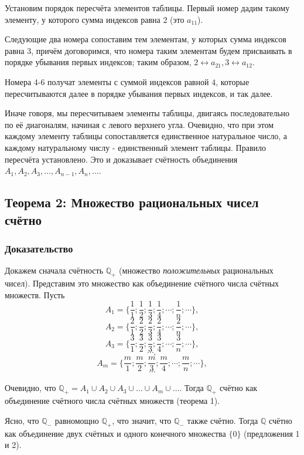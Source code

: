 \documentclass{article}
\begin{document}
Установим порядок пересчёта элементов таблицы. Первый номер дадим такому элементу, у которого сумма индексов равна $2$ (это $a_{11}$). 

Следующие два номера сопоставим тем элементам, у которых сумма индексов равна $3$, причём договоримся, что номера таким элементам будем присваивать в порядке убывания первых индексов; таким образом, $2 \leftrightarrow a_{21}, 3 \leftrightarrow a_{12}$. 

Номера 4-6 получат элементы с суммой индексов равной $4$, которые пересчитываются далее в порядке убывания первых индексов, и так далее.

Иначе говоря, мы пересчитываем элементы таблицы, двигаясь последовательно по её диагоналям, начиная с левого верхнего угла. Очевидно, что при этом каждому элементу таблицы сопоставляется единственное натуральное число, а каждому натуральному числу - единственный элемент таблицы. Правило пересчёта установлено. Это и доказывает счётность объединения $A_1, A_2, A_3, \dots, A_{n-1}, A_n, \dots$.

\subsection{Теорема 2: Множество рациональных чисел счётно}
\subsubsection*{Доказательство}

Докажем сначала счётность $\mathbb{Q}_+$ (множество \textit{положительных} рациональных чисел). Представим это множество как объединение счётного числа счётных множеств. Пусть \[
	A_1 = \{\frac{1}{1}; \frac{1}{2}; \frac{1}{3}; \frac{1}{4}; \cdots; \frac{1}{n}; \cdots\}, \]\[
	A_2 = \{\frac{2}{1}; \frac{2}{2}; \frac{2}{3}; \frac{2}{4}; \cdots; \frac{2}{n}; \cdots\}, \]\[
	A_3 = \{\frac{3}{1}; \frac{3}{2}; \frac{3}{3}; \frac{3}{4}; \cdots; \frac{3}{n}; \cdots\}, \]\[
	\cdots, \]\[
	A_m = \{\frac{m}{1}; \frac{m}{2}; \frac{m}{3}; \frac{m}{4}; \cdots; \frac{m}{n}; \cdots\}, \]\[
	\cdots
\]

Очевидно, что $\mathbb{Q}_+ = A_1 \cup A_2 \cup A_3 \cup \dots \cup A_m \cup \dots$. Тогда $\mathbb{Q}_+$ счётно как объединение счётного числа счётных множеств (теорема 1).

Ясно, что $\mathbb{Q}_-$ равномощно $\mathbb{Q}_+$, что значит, что $\mathbb{Q}_-$ также счётно. Тогда $\mathbb{Q}$ счётно как объединение двух счётных и одного конечного множества $\{0\}$ (предложения 1 и 2).
\end{document}
